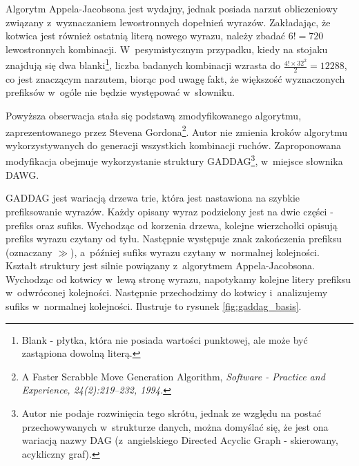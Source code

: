\documentclass[a4paper,twocolumn,12pt]{article}
\begin{document}
Algorytm Appela-Jacobsona jest wydajny, jednak posiada narzut obliczeniowy związany z~wyznaczaniem lewostronnych dopełnień wyrazów. Zakładając, że kotwica jest również ostatnią literą nowego wyrazu, należy zbadać $6! = 720$ lewostronnych kombinacji. W~pesymistycznym przypadku, kiedy na stojaku znajdują się dwa blanki\footnote{Blank - płytka, która nie posiada wartości punktowej, ale może być zastąpiona dowolną literą.}, liczba badanych kombinacji wzrasta do $\frac{4! \times 32^{2}}{2} = 12288$, co jest znaczącym narzutem, biorąc pod uwagę fakt, że większość wyznaczonych prefiksów w~ogóle nie będzie występować w~słowniku.

Powyższa obserwacja stała się podstawą zmodyfikowanego algorytmu, zaprezentowanego przez Stevena Gordona\footnote{A Faster Scrabble Move Generation Algorithm, \em{Software - Practice and Experience}, 24(2):219--232, 1994.}. Autor nie zmienia kroków algorytmu wykorzystywanych do generacji wszystkich kombinacji ruchów. Zaproponowana modyfikacja obejmuje wykorzystanie struktury GADDAG\footnote{Autor nie podaje rozwinięcia tego skrótu, jednak ze względu na postać przechowywanych w~strukturze danych, można domyślać się, że jest ona wariacją nazwy DAG (z~angielskiego Directed Acyclic Graph - skierowany, acykliczny graf).}, w~miejsce słownika DAWG. 

GADDAG jest wariacją drzewa trie, która jest nastawiona na szybkie prefiksowanie wyrazów. Każdy opisany wyraz podzielony jest na dwie części - prefiks oraz sufiks. Wychodząc od korzenia drzewa, kolejne wierzchołki opisują prefiks wyrazu czytany od tyłu. Następnie występuje znak zakończenia prefiksu (oznaczany $\gg$), a~później sufiks wyrazu czytany w~normalnej kolejności. Kształt struktury jest silnie powiązany z~algorytmem Appela-Jacobsona. Wychodząc od kotwicy w~lewą stronę wyrazu, napotykamy kolejne litery prefiksu w~odwróconej kolejności. Następnie przechodzimy do kotwicy i~analizujemy sufiks w~normalnej kolejności. Ilustruje to rysunek \ref{fig:gaddag_basis}. 
\end{document}
